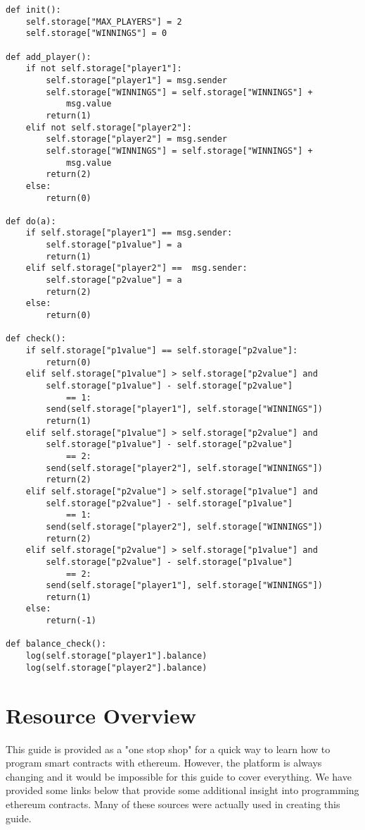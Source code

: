 \documentclass[12pt]{article}
\begin{document}
\begin{lstlisting}[frame=single]
def init():
	self.storage["MAX_PLAYERS"] = 2
	self.storage["WINNINGS"] = 0

def add_player():
	if not self.storage["player1"]:
		self.storage["player1"] = msg.sender
		self.storage["WINNINGS"] = self.storage["WINNINGS"] + 
			msg.value
		return(1)
	elif not self.storage["player2"]:
		self.storage["player2"] = msg.sender
		self.storage["WINNINGS"] = self.storage["WINNINGS"] + 
			msg.value
		return(2)
	else:
		return(0)

def do(a):
	if self.storage["player1"] == msg.sender:
		self.storage["p1value"] = a
		return(1)
	elif self.storage["player2"] ==  msg.sender:
		self.storage["p2value"] = a
		return(2)
	else:
		return(0)

def check():
	if self.storage["p1value"] == self.storage["p2value"]:
		return(0)
	elif self.storage["p1value"] > self.storage["p2value"] and 
		self.storage["p1value"] - self.storage["p2value"] 
			== 1:
		send(self.storage["player1"], self.storage["WINNINGS"]) 
		return(1)
	elif self.storage["p1value"] > self.storage["p2value"] and 
		self.storage["p1value"] - self.storage["p2value"] 
			== 2:
		send(self.storage["player2"], self.storage["WINNINGS"])
		return(2)
	elif self.storage["p2value"] > self.storage["p1value"] and 
		self.storage["p2value"] - self.storage["p1value"] 
			== 1:
		send(self.storage["player2"], self.storage["WINNINGS"])		
		return(2)
	elif self.storage["p2value"] > self.storage["p1value"] and 
		self.storage["p2value"] - self.storage["p1value"] 
			== 2:
		send(self.storage["player1"], self.storage["WINNINGS"])		
		return(1)
	else:
		return(-1)

def balance_check():
	log(self.storage["player1"].balance)
	log(self.storage["player2"].balance)
\end{lstlisting}



\section{Resource Overview}

This guide is provided as a "one stop shop" for a quick way to learn how to program smart contracts with ethereum. However, the platform is always changing and it would be impossible for this guide to cover everything. We have provided some links below that provide some additional insight into programming ethereum contracts. Many of these sources were actually used in creating this guide. 
\end{document}
